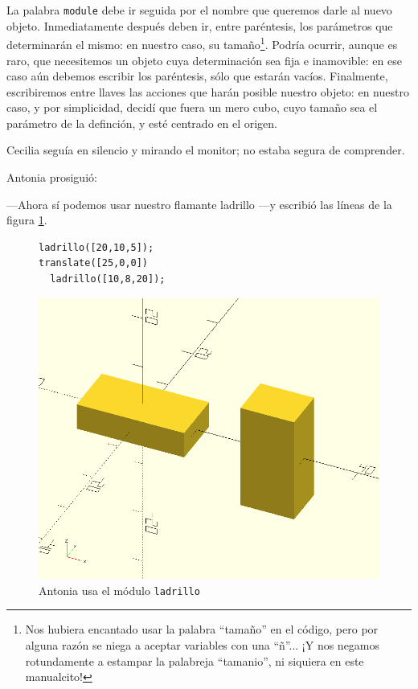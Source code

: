   \guillemotright La palabra \lstinline!module! debe ir seguida por el
  nombre que queremos darle al nuevo objeto. Inmediatamente después
  deben ir, entre paréntesis, los parámetros que determinarán el
  mismo: en nuestro caso, su tamaño\footnote{Nos hubiera encantado
    usar la palabra ``tamaño'' en el código, pero por alguna razón
    \openscad{} se niega a aceptar variables con una ``ñ''... ¡Y nos
    negamos rotundamente a estampar la palabreja ``tamanio'', ni
    siquiera en este manualcito!}. Podría ocurrir, aunque es raro, que
  necesitemos un objeto cuya determinación sea fija e inamovible: en
  ese caso aún debemos escribir los paréntesis, sólo que estarán
  vacíos. Finalmente, escribiremos entre llaves las acciones que harán
  posible nuestro objeto: en nuestro caso, y por simplicidad, decidí
  que fuera un mero cubo, cuyo tamaño sea el parámetro de la
  definción, y esté centrado en el origen.


  Cecilia seguía en silencio y mirando el monitor; no estaba segura de
  comprender.

  Antonia prosiguió:

  ---Ahora sí podemos usar nuestro flamante ladrillo ---y escribió las
  líneas de la figura \ref{fig:codigo-ladrillo}.

  
\begin{figure}[ht]
  \begin{minipage}[]{.5\textwidth}
    \begin{lstlisting}
ladrillo([20,10,5]);
translate([25,0,0])
  ladrillo([10,8,20]);
    \end{lstlisting}
  \end{minipage}\hfill
    \begin{minipage}[]{.5\textwidth}
      \centering
      \includegraphics[width=\textwidth]{imagenes/ladrillos}
    \end{minipage}
    \caption{Antonia usa el módulo \texttt{ladrillo}}
    \label{fig:codigo-ladrillo}
  \end{figure} 
  
